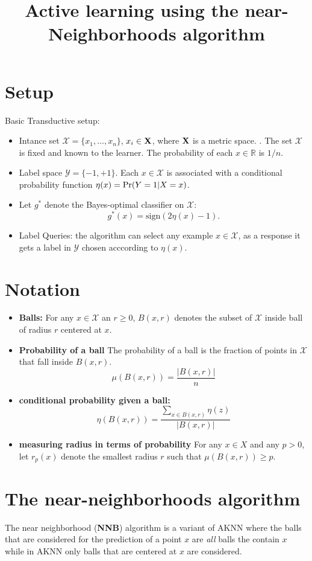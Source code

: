 \documentclass{article}
\title{Active learning using the near-Neighborhoods algorithm}
\def\R{{\mathbb{R}}}
\def\pr{{\rm Pr}}
\def\X{{\mathcal X}}
\def\Y{{\mathcal Y}}
\begin{document}
\maketitle

\section{Setup}

Basic Transductive setup:
\begin{itemize}
\item Intance set $\X =\{x_1,\dots,x_n\}$, $x_i \in {\bf X}$, where
  ${\bf X}$ is a metric space. . The set
  $\X$ is fixed and known to the learner. The probability of each $x
  \in \R$ is $1/n$.
\item Label space $\Y = \{-1,+1\}$. Each $x \in \X$ is associated with
  a conditional probability function $\eta(x) = \pr(Y=1|X=x)$.
\item Let $g^*$ denote the Bayes-optimal classifier on $\X$:
  $$ g^*(x) = \mbox{sign}(2 \eta(x) - 1) .$$
  \item Label Queries: the algorithm can select any example $x \in
    \X$, as a response it gets a label in $\Y$ chosen acccording to
    $\eta(x)$.    
  \end{itemize}

\section{Notation}
\begin{itemize}
\item {\bf Balls:} For any $x \in \X$ an $r\geq0$,
  $B(x,r)$ denotes the subset of $\X$ inside ball of radius $r$ centered at $x$.
  \item {\bf Probability of a ball} The probability of a ball is the
    fraction of points in $\X$ that fall inside $B(x,r)$.
    $$ \mu(B(x,r)) = \frac{ |B(x,r)|}{n}$$
  \item {\bf conditional probability given a ball:}
    $$ \eta(B(x,r)) = \frac{\sum_{x \in B(x,r)}\eta(z)}{|B(x,r)|}$$
  \item {\bf measuring radius in terms of probability}
For any $x \in X$ and any $p > 0$, let $r_p(x)$ denote the smallest
radius $r$ such that $\mu(B(x, r)) \geq p$.
\end{itemize}

\newcommand{\NNB}{{\bf NNB}}
\newcommand{\ANNB}{{\bf ANNB}}
\newcommand{\ONNB}{{\bf oracle-NNB}}

\section{The near-neighborhoods algorithm}
The near neighborhood (\NNB) algorithm is a variant of AKNN where the balls
that are considered for the prediction of a point $x$ are {\em all} balls
the contain $x$ while in AKNN only balls that are centered at $x$ are
considered.
\end{document}
